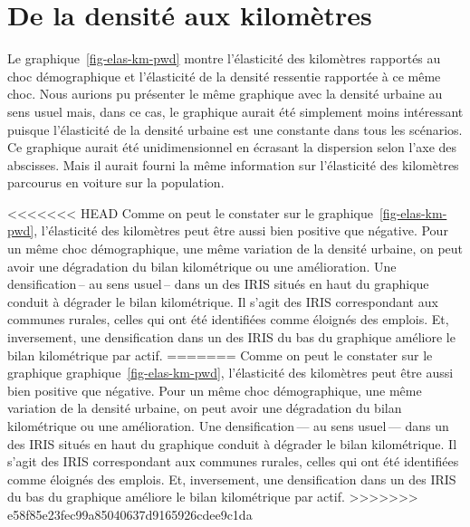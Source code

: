 \documentclass[
  9pt,
  a4paper,
  DIV=11]{scrreprt}
\begin{document}
\section{De la densité aux
kilomètres}\label{de-la-densituxe9-aux-kilomuxe8tres}

Le graphique~\ref{fig-elas-km-pwd} montre l'élasticité des kilomètres
rapportés au choc démographique et l'élasticité de la densité ressentie
rapportée à ce même choc. Nous aurions pu présenter le même graphique
avec la densité urbaine au sens usuel mais, dans ce cas, le graphique
aurait été simplement moins intéressant puisque l'élasticité de la
densité urbaine est une constante dans tous les scénarios. Ce graphique
aurait été unidimensionnel en écrasant la dispersion selon l'axe des
abscisses. Mais il aurait fourni la même information sur l'élasticité
des kilomètres parcourus en voiture sur la population.

\textless\textless\textless\textless\textless\textless\textless{} HEAD
Comme on peut le constater sur le graphique~\ref{fig-elas-km-pwd},
l'élasticité des kilomètres peut être aussi bien positive que négative.
Pour un même choc démographique, une même variation de la densité
urbaine, on peut avoir une dégradation du bilan kilométrique ou une
amélioration. Une densification\,-- au sens usuel\,-- dans un des IRIS
situés en haut du graphique conduit à dégrader le bilan kilométrique. Il
s'agit des IRIS correspondant aux communes rurales, celles qui ont été
identifiées comme éloignés des emplois. Et, inversement, une
densification dans un des IRIS du bas du graphique améliore le bilan
kilométrique par actif. ======= Comme on peut le constater sur le
graphique graphique~\ref{fig-elas-km-pwd}, l'élasticité des kilomètres
peut être aussi bien positive que négative. Pour un même choc
démographique, une même variation de la densité urbaine, on peut avoir
une dégradation du bilan kilométrique ou une amélioration. Une
densification\,--- au sens usuel\,--- dans un des IRIS situés en haut du
graphique conduit à dégrader le bilan kilométrique. Il s'agit des IRIS
correspondant aux communes rurales, celles qui ont été identifiées comme
éloignés des emplois. Et, inversement, une densification dans un des
IRIS du bas du graphique améliore le bilan kilométrique par actif.
\textgreater\textgreater\textgreater\textgreater\textgreater\textgreater\textgreater{}
e58f85e23fec99a85040637d9165926cdee9c1da
\end{document}
